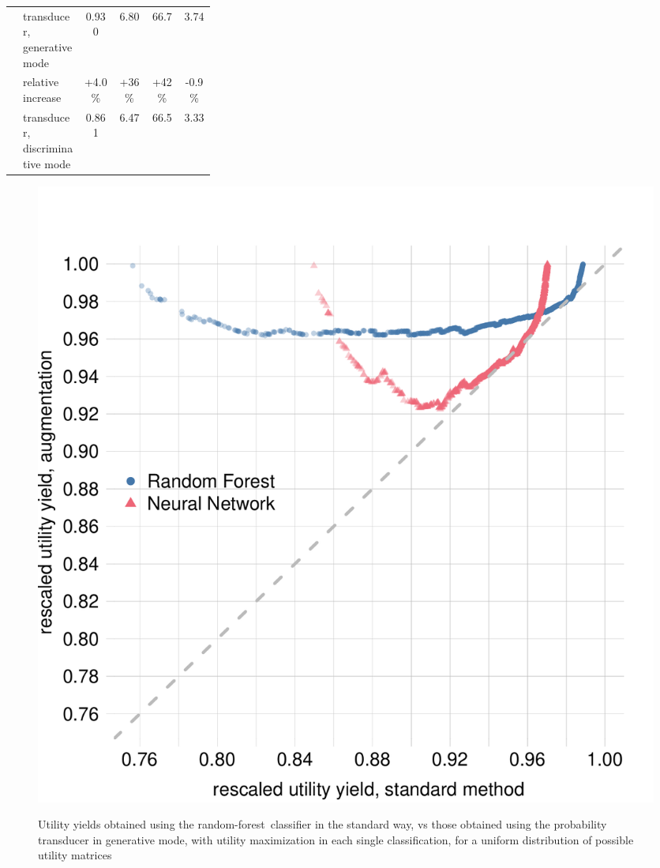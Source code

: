 \documentclass[\ifafour a4paper,12pt,\else a5paper,10pt,\fi%
onecolumn,oneside,article,%
british%
]{memoir}
\theoremstyle{remark}
\theoremstyle{innote}
\renewcommand*{\|}[1][]{\nonscript\:#1\vert\nonscript\:\mathopen{}}
\newcommand*{\rf}{random-forest}
\begin{document}
\begin{table}[!t]
\begin{tabular}{cp{0.3\linewidth}cccc}
 &\parbox{\linewidth}{\color{mypurpleblue}transducer,\\ generative mode}
 &\textcolor{mypurpleblue}{0.930}
 &\textcolor{mypurpleblue}{6.80}
 &\textcolor{mypurpleblue}{66.7}
 &\textcolor{mypurpleblue}{3.74}
 \\[1\jot]
 &\footnotesize relative increase
 &\footnotesize+4.0\%
 &\footnotesize+36\%
 &\footnotesize+42\%
 &\footnotesize-0.9\%
 \\[1\jot]
 &\parbox{\linewidth}{\color{myyellow}\scriptsize transducer,\\ discriminative mode}
 &\textcolor{myyellow}{\scriptsize 0.861}
 &\textcolor{myyellow}{\scriptsize 6.47}
 &\textcolor{myyellow}{\scriptsize 66.5}
 &\textcolor{myyellow}{\scriptsize 3.33}
 \end{tabular}
\end{table}
\fi



\iffalse
\begin{figure}[t]
  \centering
  \includegraphics[width=\linewidth]{RFCNN_transducer_gains_max.pdf}\\
  \caption{Utility yields obtained using the \rf\ classifier in the standard way, vs those obtained using the probability transducer in generative mode, with utility maximization in each single classification, for a uniform distribution of possible utility matrices}
  \label{fig:RF_gain_gener_UMspace}
\end{figure}
\end{document}
